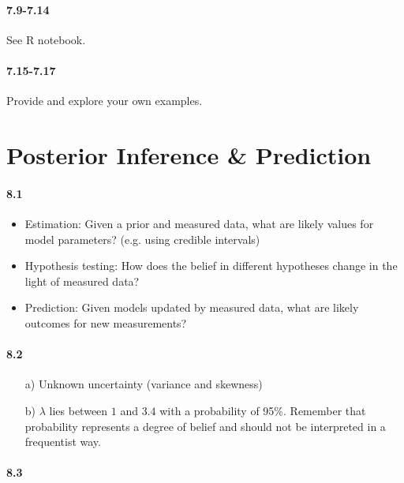 \documentclass[fontsize=11pt,DIV=18,parskip=half]{scrartcl}
\begin{document}
\paragraph{7.9-7.14} See R notebook.

\paragraph{7.15-7.17} Provide and explore your own examples.



\section{Posterior Inference \& Prediction}

\paragraph{8.1}

\begin{itemize}
\item Estimation: Given a prior and measured data, what are likely values for model parameters? (e.g. using credible intervals)
\item Hypothesis testing: How does the belief in different hypotheses change in the light of measured data?
\item Prediction: Given models updated by measured data, what are likely outcomes for new measurements?
\end{itemize}

\paragraph{8.2} 

\begin{enumerate}
\item[a)] Unknown uncertainty (variance and skewness)
\item[b)] $\lambda$ lies between $1$ and $3.4$ with a probability of 95\%. Remember that probability represents a degree of belief and should not be interpreted in a frequentist way.
\end{enumerate}

\paragraph{8.3}
\end{document}
